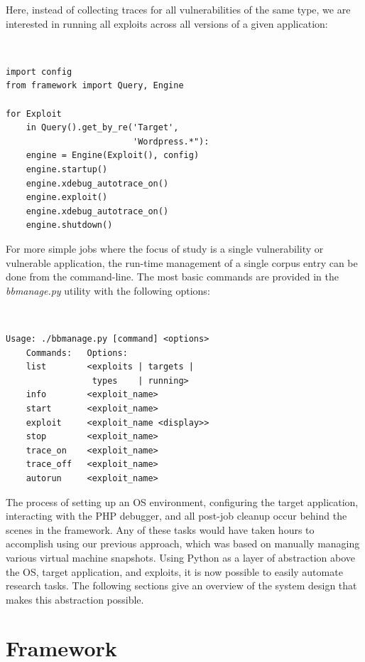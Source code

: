 \documentclass[letterpaper,twocolumn,10pt]{article}
\begin{document}

Here, instead of collecting traces for all vulnerabilities of the same type, we are interested in running all exploits across all versions of a given application:

\begin{minipage}{\textwidth}
{\tt \footnotesize
\begin{lstlisting}
import config
from framework import Query, Engine

for Exploit 
    in Query().get_by_re('Target', 
                         'Wordpress.*"):
    engine = Engine(Exploit(), config)
    engine.startup()
    engine.xdebug_autotrace_on()
    engine.exploit()
    engine.xdebug_autotrace_on()
    engine.shutdown()
\end{lstlisting}
}
\end{minipage}

For more simple jobs where the focus of study is a single vulnerability or vulnerable application, the run-time management of a single corpus entry can be done from the command-line. The most basic commands are provided in the \emph{bbmanage.py} utility with the following options:

{\tt \footnotesize
\begin{verbatim}
Usage: ./bbmanage.py [command] <options>
    Commands:   Options:
    list        <exploits | targets | 
                 types    | running>
    info        <exploit_name>
    start       <exploit_name>
    exploit     <exploit_name <display>>
    stop        <exploit_name>
    trace_on    <exploit_name>
    trace_off   <exploit_name>
    autorun     <exploit_name>
\end{verbatim}
}

The process of setting up an OS environment, configuring the target application, interacting with the PHP debugger, and all post-job cleanup occur behind the scenes in the framework. Any of these tasks would have taken hours to accomplish using our previous approach, which was based on manually managing various virtual machine snapshots. Using Python as a layer of abstraction above the OS, target application, and exploits, it is now possible to easily automate research tasks. The following sections give an overview of the system design that makes this abstraction possible.

\section{Framework}
\end{document}
